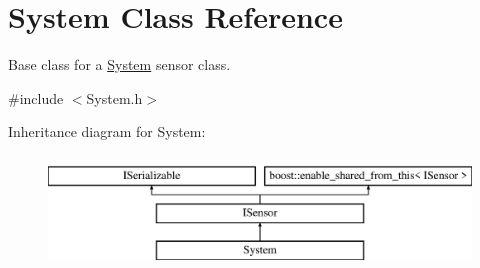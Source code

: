 \hypertarget{class_system}{}\section{System Class Reference}
\label{class_system}


Base class for a \hyperlink{class_system}{System} sensor class.  




{\ttfamily \#include $<$System.\+h$>$}

Inheritance diagram for System\+:\begin{figure}[H]
\begin{center}
\leavevmode
\includegraphics[height=3.000000cm]{class_system}
\end{center}
\end{figure}
